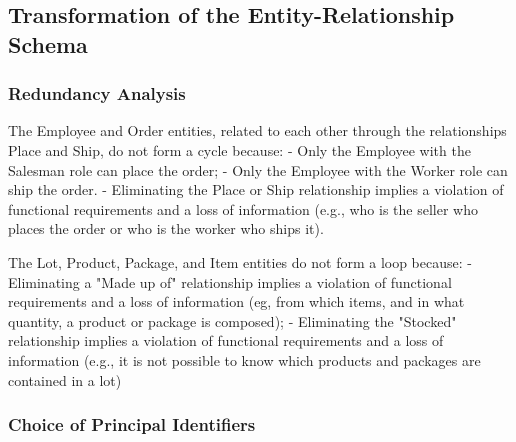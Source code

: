 \subsection{Transformation of the Entity-Relationship Schema}

\subsubsection{Redundancy Analysis}

The Employee and Order entities, related to each other through the relationships Place and Ship, do not form a cycle because:
- Only the Employee with the Salesman role can place the order;
- Only the Employee with the Worker role can ship the order.
- Eliminating the Place or Ship relationship implies a violation of functional requirements and a loss of information (e.g., who is the seller who places the order or who is the worker who ships it).

The Lot, Product, Package, and Item entities do not form a loop because:
- Eliminating a "Made up of" relationship implies a violation of functional requirements and a loss of information (eg, from which items, and in what quantity, a product or package is composed);
- Eliminating the "Stocked" relationship implies a violation of functional requirements and a loss of information (e.g., it is not possible to know which products and packages are contained in a lot)


\subsubsection{Choice of Principal Identifiers}
